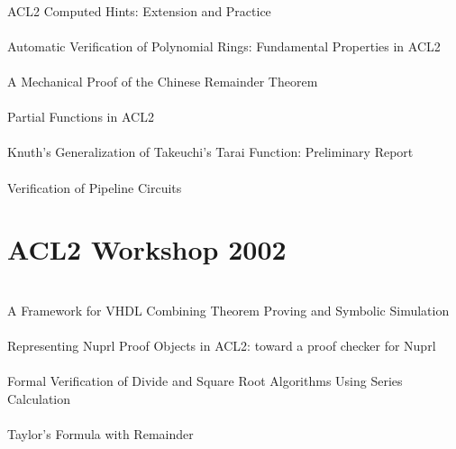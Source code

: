 \documentclass{article}
\begin{document}
\cite{00-sawada-computed} \\
ACL2 Computed Hints: Extension and Practice \\

\cite{00-bulo-polynomial} \\
Automatic Verification of Polynomial Rings: Fundamental Properties in ACL2 \\

\cite{00-russinoff-chinese} \\
A Mechanical Proof of the Chinese Remainder Theorem \\

\cite{00-manolios-partial} \\
Partial Functions in ACL2 \\

\cite{00-bailey-tarai} \\
Knuth's Generalization of Takeuchi's Tarai Function: Preliminary Report \\

\cite{00-kaufmann-pipeline} \\
Verification of Pipeline Circuits \\


\section{ACL2 Workshop 2002}

\cite{02-barrione-vhdl} \\
A Framework for VHDL Combining Theorem Proving and Symbolic Simulation \\

\cite{02-caldwell-nuprl} \\
Representing Nuprl Proof Objects in ACL2: toward a proof checker for Nuprl \\

\cite{02-sawada-sqrt} \\
Formal Verification of Divide and Square Root Algorithms Using Series Calculation \\

\cite{02-gamboa-taylor} \\
Taylor's Formula with Remainder \\
\end{document}
